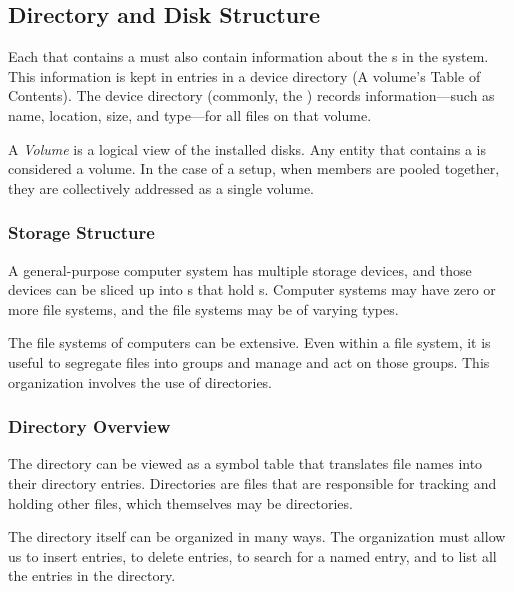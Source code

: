 \subsection{Directory and Disk Structure}\label{subsec:Directory_Disk_Structure}
Each  that contains a  must also contain information about the s in the system.
This information is kept in entries in a device directory (A volume's Table of Contents).
The device directory (commonly, the ) records information—such as name, location, size, and type—for all files on that volume.

\begin{definition}[Volume]\label{def:Volume}
  A \emph{Volume} is a logical view of the installed disks.
  Any entity that contains a  is considered a volume.
  In the case of a  setup, when members are pooled together, they are collectively addressed as a single volume.
\end{definition}

\subsubsection{Storage Structure}\label{subsubsec:Storage_Structure}
A general-purpose computer system has multiple storage devices, and those devices can be sliced up into s that hold s.
Computer systems may have zero or more file systems, and the file systems may be of varying types.

The file systems of computers can be extensive.
Even within a file system, it is useful to segregate files into groups and manage and act on those groups.
This organization involves the use of directories.

\subsubsection{Directory Overview}\label{subsubsec:Directory_Overview}
\begin{definition}[Directory]\label{def:Directory}
  The directory can be viewed as a symbol table that translates file names into their directory entries.
  Directories are files that are responsible for tracking and holding other files, which themselves may be directories.
\end{definition}

The directory itself can be organized in many ways.
The organization must allow us to insert entries, to delete entries, to search for a named entry, and to list all the entries in the directory.


